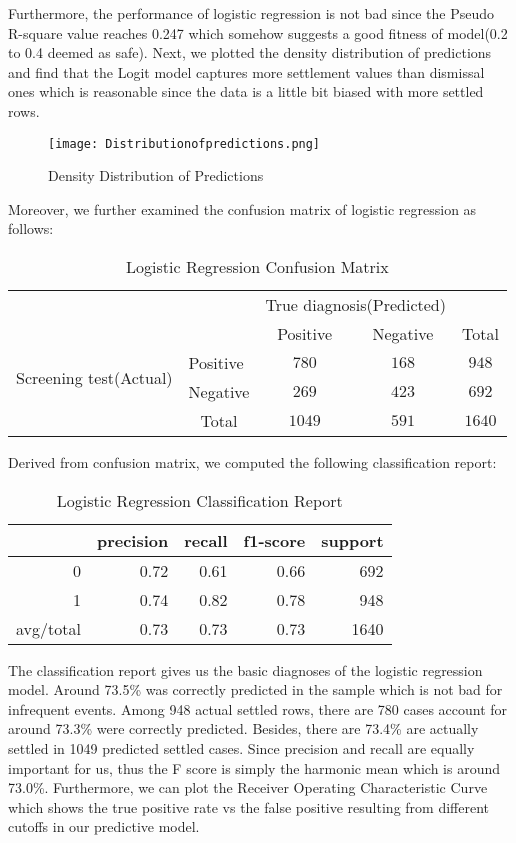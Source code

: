 Furthermore, the performance of logistic regression is not bad since the Pseudo R-square value reaches 0.247 which somehow suggests a good fitness of model(0.2 to 0.4 deemed as safe). Next, we plotted the density distribution of predictions and find that  the Logit model captures more settlement values than dismissal ones which is reasonable since the data is a little bit biased with more settled rows. 
\begin{figure}[H]
  \centering
  \texttt{[image: Distributionofpredictions.png]}
  \caption{Density Distribution of Predictions}
\end{figure}
Moreover, we further examined the confusion matrix of logistic regression as follows:
\begin{table}[H]
\caption{Logistic Regression Confusion Matrix}
\centering
\begin{tabular}{l|l|c|c|c}
\multicolumn{2}{c}{}&\multicolumn{2}{c}{True diagnosis(Predicted)}&\\
\cline{3-4}
\multicolumn{2}{c|}{}&Positive&Negative&\multicolumn{1}{c}{Total}\\
\cline{2-4}
\multirow{2}{*}{Screening test(Actual)}& Positive & $780$ & $168$ & $948$\\
\cline{2-4}
& Negative & $269$ & $423$ & $692$\\
\cline{2-4}
\multicolumn{1}{c}{} & \multicolumn{1}{c}{Total} & \multicolumn{1}{c}{$1049$} & \multicolumn{    1}{c}{$591$} & \multicolumn{1}{c}{$1640$}\\
\end{tabular}
\end{table}
Derived from confusion matrix, we computed the following classification report:
\begin{table}[H]
  \centering
  \caption{Logistic Regression Classification Report}
    \begin{tabular}{rrrrr}
    \rowcolor{gray}
         & precision & recall & f1-score & support \\
         \hline
     0 & 0.72   & 0.61     & 0.66  & 692 \\
     1 & 0.74     & 0.82   & 0.78    & 948 \\
    avg/total & 0.73   & 0.73   & 0.73  & 1640 \\
    \bottomrule
    \end{tabular}
  \label{tab:addlabel}
\end{table}
The classification report gives us the basic diagnoses of the logistic regression model. Around 73.5\% was correctly predicted in the sample which is not bad for infrequent events. Among 948 actual settled rows, there are 780 cases account for around 73.3\% were correctly predicted. Besides, there are 73.4\% are actually settled in 1049 predicted settled cases. Since precision and recall are equally important for us, thus the F score is simply the harmonic mean which is around 73.0\%. Furthermore, we can plot the Receiver Operating Characteristic Curve which shows the true positive rate vs the false positive resulting from different cutoffs in our predictive model. 
